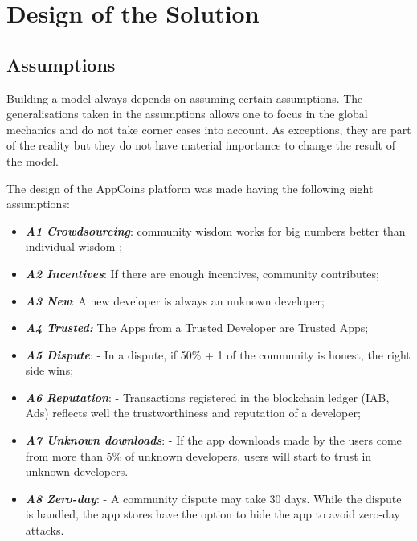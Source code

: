\section{Design of the Solution}

\label{sec:design}

\subsection{Assumptions}


Building a model always depends on assuming certain assumptions. The generalisations taken in the assumptions allows one to focus in the global mechanics and do not take corner cases into account. As exceptions, they are part of the reality but they do not have material importance to change the result of the model.

The design of the AppCoins platform was made having the following eight assumptions:

\begin{itemize}
\item {\bf\em A1 Crowdsourcing}: community wisdom works for big numbers better than individual wisdom \cite{Surowiecki:2005:WC:1095645};
\item {\bf\em A2 Incentives}: If there are enough incentives, community contributes;
\item {\bf\em A3 New}: A new developer is always an unknown developer;
\item {\bf\em A4 Trusted:} The Apps from a Trusted Developer are Trusted Apps;
\item {\bf\em A5 Dispute}: - In a dispute, if 50\% + 1 of the community is honest, the right side wins;
\item {\bf\em A6 Reputation}: - Transactions registered in the blockchain ledger (IAB, Ads) reflects well the trustworthiness and reputation of a developer;
\item {\bf\em A7 Unknown downloads}: - If the app downloads made by the users come from more than 5\% of unknown developers, users will start to trust in unknown developers. %
\item {\bf\em A8 Zero-day}: - A community dispute may take 30 days. While the dispute is handled, the app stores have the option to hide the app to avoid zero-day attacks.
\end{itemize}



